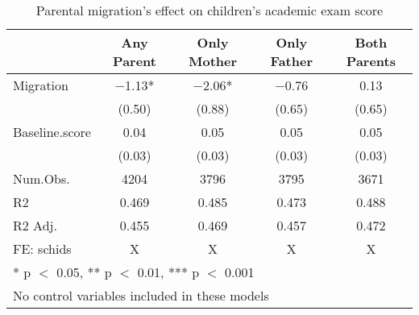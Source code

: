 \documentclass[
  man]{apa7}
\begin{document}
\begin{table}

\caption{Parental migration’s effect on children’s academic exam score}
\centering
\begin{tabular}[t]{lcccc}
\toprule
  & Any Parent & Only Mother & Only Father & Both Parents\\
\midrule
Migration & \num{-1.13}* & \num{-2.06}* & \num{-0.76} & \num{0.13}\\
 & (\num{0.50}) & (\num{0.88}) & (\num{0.65}) & (\num{0.65})\\
Baseline.score & \num{0.04} & \num{0.05} & \num{0.05} & \num{0.05}\\
 & (\num{0.03}) & (\num{0.03}) & (\num{0.03}) & (\num{0.03})\\
\midrule
Num.Obs. & \num{4204} & \num{3796} & \num{3795} & \num{3671}\\
R2 & \num{0.469} & \num{0.485} & \num{0.473} & \num{0.488}\\
R2 Adj. & \num{0.455} & \num{0.469} & \num{0.457} & \num{0.472}\\
FE: schids & X & X & X & X\\
\bottomrule
\multicolumn{5}{l}{\rule{0pt}{1em}* p $<$ 0.05, ** p $<$ 0.01, *** p $<$ 0.001}\\
\multicolumn{5}{l}{\rule{0pt}{1em}No control variables included in these models}\\
\end{tabular}
\end{table}
\end{document}
